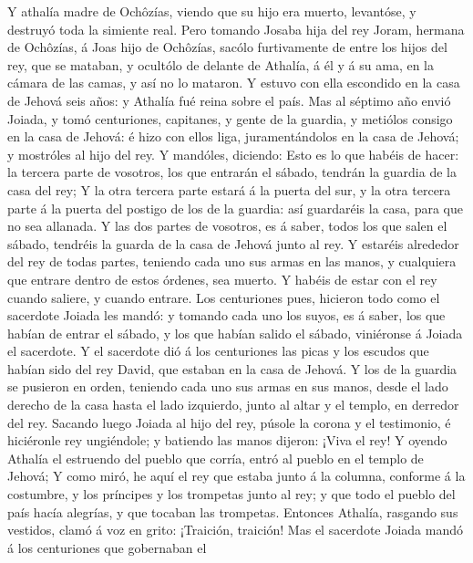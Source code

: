  Y athalía madre de Ochôzías, viendo que su hijo era muerto,
levantóse, y destruyó toda la simiente real.  Pero tomando
Josaba hija del rey Joram, hermana de Ochôzías, á Joas hijo de Ochôzías,
sacólo furtivamente de entre los hijos del rey, que se mataban, y
ocultólo de delante de Athalía, á él y á su ama, en la cámara de las
camas, y así no lo mataron.  Y estuvo con ella escondido en
la casa de Jehová seis años: y Athalía fué reina sobre el país.
 Mas al séptimo año envió Joiada, y tomó centuriones,
capitanes, y gente de la guardia, y metiólos consigo en la casa de
Jehová: é hizo con ellos liga, juramentándolos en la casa de Jehová; y
mostróles al hijo del rey.  Y mandóles, diciendo: Esto es lo
que habéis de hacer: la tercera parte de vosotros, los que entrarán el
sábado, tendrán la guardia de la casa del rey;  Y la otra
tercera parte estará á la puerta del sur, y la otra tercera parte á la
puerta del postigo de los de la guardia: así guardaréis la casa, para
que no sea allanada.  Y las dos partes de vosotros, es á
saber, todos los que salen el sábado, tendréis la guarda de la casa de
Jehová junto al rey.  Y estaréis alrededor del rey de todas
partes, teniendo cada uno sus armas en las manos, y cualquiera que
entrare dentro de estos órdenes, sea muerto. Y habéis de estar con el
rey cuando saliere, y cuando entrare.  Los centuriones pues,
hicieron todo como el sacerdote Joiada les mandó: y tomando cada uno los
suyos, es á saber, los que habían de entrar el sábado, y los que habían
salido el sábado, viniéronse á Joiada el sacerdote.  Y el
sacerdote dió á los centuriones las picas y los escudos que habían sido
del rey David, que estaban en la casa de Jehová.  Y los de
la guardia se pusieron en orden, teniendo cada uno sus armas en sus
manos, desde el lado derecho de la casa hasta el lado izquierdo, junto
al altar y el templo, en derredor del rey.  Sacando luego
Joiada al hijo del rey, púsole la corona y el testimonio, é hiciéronle
rey ungiéndole; y batiendo las manos dijeron: ¡Viva el rey!
 Y oyendo Athalía el estruendo del pueblo que corría, entró
al pueblo en el templo de Jehová;  Y como miró, he aquí el
rey que estaba junto á la columna, conforme á la costumbre, y los
príncipes y los trompetas junto al rey; y que todo el pueblo del país
hacía alegrías, y que tocaban las trompetas. Entonces Athalía, rasgando
sus vestidos, clamó á voz en grito: ¡Traición, traición! 
Mas el sacerdote Joiada mandó á los centuriones que gobernaban el
